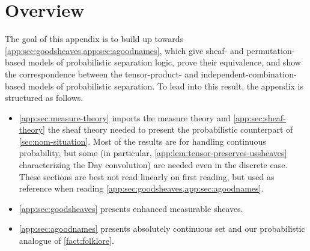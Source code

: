 \documentclass[
  sigconf,
  screen, ]{acmart}
\theoremstyle{definition}
\newcommand\nref[2]{\hyperref[#1]{#2}} \newcommand\checkhigh{{\huge{\color{red}\textbf{TODO: check}}}}
\newcommand\op{^{\rm op}}
\newcommand\texforgetmu{\mathrm{U}}
\newcommand\forgetmu{{\nref{def:forgetmu}{\texforgetmu}}}
\newcommand\texhcube{{{{\mathbb I}^\omega}}}
\newcommand\hcube{{\nref{def:hcube}{\texhcube}}}
\newcommand\texagoodname{absolutely continuous set}
\newcommand\texAgoodname{Absolutely continuous set}
\newcommand\agoodname{\texagoodname}
\newcommand\Agoodname{\texAgoodname}
\newcommand\agoodnamenolink{\texagoodname}
\newcommand\sheafcatadj{enhanced measurable}
\newcommand\Sheafcatadj{Enhanced measurable}
\newcommand\texgoodsheaf{\sheafcatadj{} sheaf}
\newcommand\texGoodsheaf{\Sheafcatadj{} sheaf}
\newcommand\goodsheaf{\texgoodsheaf}
\newcommand\Goodsheaf{\texGoodsheaf}
\newcommand\texgoodsheaves{\sheafcatadj{} sheaves}
\newcommand\texGoodsheaves{\Sheafcatadj{} sheaves}
\newcommand\goodsheaves{\texgoodsheaves}
\newcommand\Goodsheaves{\texGoodsheaves}
\newcommand\goodsheavesnolink{\sheafcatadj{} sheaves}
\newcommand\texStdProb{\mathbf{Prob}_{\rm std}}
\newcommand\StdProb{{\nref{def:stdprob}{\texStdProb}}}
\newcommand\StdProbAlg{\nref{def:StdProbAlg}{\mathbf{ProbAlg}_{\rm std}}}
\newcommand\StdProbAlgop{\nref{def:StdProbAlg}{\mathbf{ProbAlg}_{\rm std}\op}}
\newcommand\texStdMble{\mathbf{EMS}_{\rm std}}
\newcommand\StdMble{{\nref{def:mblecat}{\texStdMble}}}
\newcommand\StdMbleop{{\nref{def:mblecat}{\texStdMble\op}}}
\newcommand\StdMbleAlg{{\nref{def:StdMbleAlg}{\mathbf{MbleAlg}_{\rm std}}}}
\newcommand\StdMbleAlgop{{\nref{def:StdMbleAlg}{\mathbf{MbleAlg}_{\rm std}\op}}}
\newcommand\texpspcs{\mathbb P}
\newcommand\pspcs{{\nref{def:mble-pspcs}{\texpspcs}}}
\newcommand\texauti{\mathbf{G}^{\ll}}
\newcommand\auti{{\nref{def:auti}{\texauti}}}
\newcommand\texgpspcs{\overline{\mathbb P}}
\newcommand\gpspcs{{\nref{def:gpspcs}{\texgpspcs}}}
\newcommand\texgRV{\overline{\operatorname{RV}}}
\newcommand\gRV{{\nref{def:gRV}{\texgRV}}}
\begin{document}



\pagebreak
\appendix
\onecolumn

\ifdefined\noapp
\else
\renewcommand\StdProb{\nref{app:def:stdprob}{\texStdProb}}
\renewcommand\StdProbAlg{\nref{app:def:stdprobalg}{\mathbf{ProbAlg}_{\rm std}}}
\renewcommand\StdProbAlgop{\nref{app:def:stdprobalg}{\mathbf{ProbAlg}_{\rm std}\op}}
\renewcommand\StdMble{{\nref{app:def:mblecat}{\texStdMble}}}
\renewcommand\StdMbleop{{\nref{app:def:mblecat}{\texStdMble\op}}}
\renewcommand\StdMbleAlg{{\nref{app:def:stdmblealg}{\mathbf{MbleAlg}_{\rm std}}}}
\renewcommand\StdMbleAlgop{{\nref{app:def:stdmblealg}{\mathbf{MbleAlg}_{\rm std}\op}}}
\renewcommand\forgetmu{{\nref{app:def:forgetmu}{\texforgetmu}}}
\renewcommand\goodsheaf{{\nref{app:def:goodsheaf}{\texgoodsheaf}}}
\renewcommand\Goodsheaf{{\nref{app:def:goodsheaf}{\texGoodsheaf}}}
\renewcommand\goodsheaves{{\nref{app:def:goodsheaf}{\texgoodsheaves}}}
\renewcommand\Goodsheaves{{\nref{app:def:goodsheaf}{\texGoodsheaves}}}
\renewcommand\pspcs{{\nref{app:def:mble-pspcs}{\texpspcs}}}
\renewcommand\hcube{{\nref{app:def:hcube}{\texhcube}}}
\renewcommand\auti{{\nref{app:def:auti}{\texauti}}}
\renewcommand\agoodname{{\nref{app:def:pnom}{\texagoodname}}}
\renewcommand\Agoodname{{\nref{app:def:pnom}{\texAgoodname}}}
\renewcommand\gpspcs{{\nref{app:def:pspcs-pnom}{\texgpspcs}}}
\renewcommand\gRV{{\nref{app:def:rv-pnom}{\texgRV}}}

\section{Overview}

The goal of this appendix is to build up towards
\cref{app:sec:goodsheaves,app:sec:agoodnames},
which give sheaf- and permutation-based models of
probabilistic separation logic, prove their equivalence, and show the correspondence
between the tensor-product- and independent-combination-based
models of probabilistic separation.
To lead into this result, the appendix is structured as follows.
\begin{itemize}
    \item 
      \cref{app:sec:measure-theory}
      imports the measure theory
      and
      \cref{app:sec:sheaf-theory}
      the sheaf theory
      needed to present the probabilistic counterpart of
      \cref{sec:nom-situation}.
      Most of the results are for handling continuous probability,
      but some (in particular, \cref{app:lem:tensor-preserves-ussheaves}
      characterizing the Day convolution)
      are needed even in the discrete case.
      These sections are best not read linearly on first reading, but 
      used as reference when reading \cref{app:sec:goodsheaves,app:sec:agoodnames}.
    \item \cref{app:sec:goodsheaves} presents \goodsheavesnolink{}.
    \item \cref{app:sec:agoodnames} presents \agoodnamenolink{}
      and our probabilistic analogue of \cref{fact:folklore}.
\end{itemize}
\end{document}
